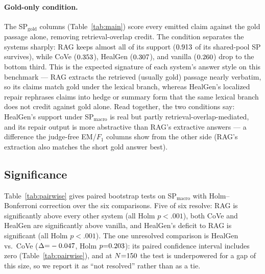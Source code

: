 \paragraph{Gold-only condition.}
The SP$_{\text{gold}}$ columns (Table~\ref{tab:main}) score every
emitted claim against the gold passage alone, removing retrieval-overlap
credit.  The condition separates the systems sharply: RAG keeps almost
all of its support ($0.913$ of its shared-pool SP survives), while
CoVe ($0.353$), HealGen ($0.307$), and vanilla
($0.260$) drop to the bottom third.  This is the expected
signature of each system's answer style on this benchmark --- RAG
extracts the retrieved (usually gold) passage nearly verbatim, so its
claims match gold under the lexical branch, whereas HealGen's localized
repair rephrases claims into hedge or summary form that the same lexical
branch does not credit against gold alone.  Read together, the two
conditions say: HealGen's support under SP$_{\text{macro}}$ is real but
partly retrieval-overlap-mediated, and its repair output is more
abstractive than RAG's extractive answers --- a difference the
judge-free EM/$F_1$ columns show from the other side (RAG's extraction
also matches the short gold answer best).

\subsection{Significance}
Table~\ref{tab:pairwise} gives paired bootstrap tests on
SP$_{\text{macro}}$ with Holm--Bonferroni correction over the six
comparisons.  Five of six resolve: RAG is significantly above every
other system (all Holm $p{<}.001$), both CoVe and HealGen are
significantly above vanilla, and HealGen's deficit to RAG is
significant (all Holm $p{<}.001$).  The one
unresolved comparison is HealGen vs.\ CoVe ($\Delta{=}-0.047$,
Holm $p{=}0.203$): its paired confidence interval includes zero
(Table~\ref{tab:pairwise}), and at $N{=}150$ the test is underpowered
for a gap of this size, so we report it as ``not resolved'' rather
than as a tie.

\begin{table}[t]
\centering
\caption{Pairwise tests on SP$_{\text{macro}}$: $\Delta$ with 95\%
paired-bootstrap CI (2000 resamples), Holm-corrected over 6
comparisons; $^{*}$ marks Holm $p<.05$.}
\label{tab:pairwise}
\resizebox{\columnwidth}{!}{}
\end{table}

